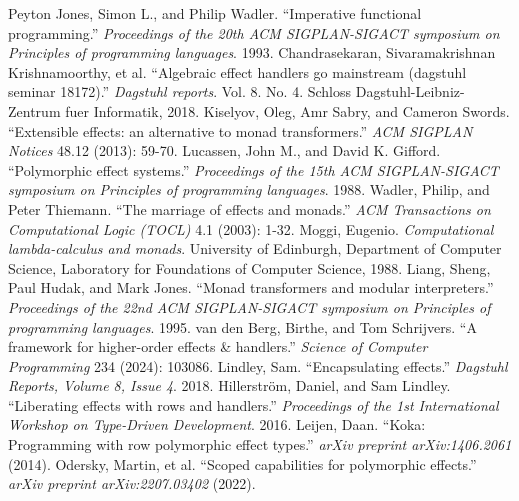 \documentclass[conference]{IEEEtran}
\begin{document}
    \begin{thebibliography}{00}
         Peyton Jones, Simon L., and Philip Wadler. ``Imperative functional programming.'' \textit{Proceedings of the 20th ACM SIGPLAN-SIGACT symposium on Principles of programming languages}. 1993.
         Chandrasekaran, Sivaramakrishnan Krishnamoorthy, et al. ``Algebraic effect handlers go mainstream (dagstuhl seminar 18172).'' \textit{Dagstuhl reports}. Vol. 8. No. 4. Schloss Dagstuhl-Leibniz-Zentrum fuer Informatik, 2018.
         Kiselyov, Oleg, Amr Sabry, and Cameron Swords. ``Extensible effects: an alternative to monad transformers.'' \textit{ACM SIGPLAN Notices} 48.12 (2013): 59-70.
         Lucassen, John M., and David K. Gifford. ``Polymorphic effect systems.'' \textit{Proceedings of the 15th ACM SIGPLAN-SIGACT symposium on Principles of programming languages}. 1988.
         Wadler, Philip, and Peter Thiemann. ``The marriage of effects and monads.'' \textit{ACM Transactions on Computational Logic (TOCL)} 4.1 (2003): 1-32.
         Moggi, Eugenio. \textit{Computational lambda-calculus and monads}. University of Edinburgh, Department of Computer Science, Laboratory for Foundations of Computer Science, 1988.
         Liang, Sheng, Paul Hudak, and Mark Jones. ``Monad transformers and modular interpreters.'' \textit{Proceedings of the 22nd ACM SIGPLAN-SIGACT symposium on Principles of programming languages}. 1995.
         van den Berg, Birthe, and Tom Schrijvers. ``A framework for higher-order effects \& handlers.'' \textit{Science of Computer Programming} 234 (2024): 103086.
         Lindley, Sam. ``Encapsulating effects.'' \textit{Dagstuhl Reports, Volume 8, Issue 4}. 2018.
         Hillerström, Daniel, and Sam Lindley. ``Liberating effects with rows and handlers.'' \textit{Proceedings of the 1st International Workshop on Type-Driven Development}. 2016.
         Leijen, Daan. ``Koka: Programming with row polymorphic effect types.'' \textit{arXiv preprint arXiv:1406.2061} (2014).
         Odersky, Martin, et al. ``Scoped capabilities for polymorphic effects.'' \textit{arXiv preprint arXiv:2207.03402} (2022).
    \end{thebibliography}
\end{document}
